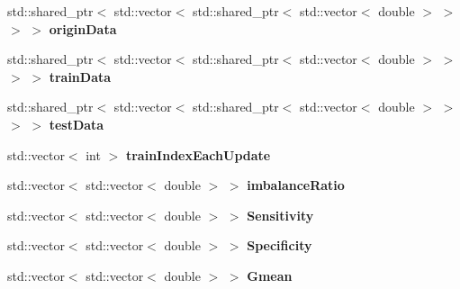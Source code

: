 \begin{DoxyCompactItemize}
\item 
std\+::shared\+\_\+ptr$<$ std\+::vector$<$ std\+::shared\+\_\+ptr$<$ std\+::vector$<$ double $>$ $>$ $>$ $>$ {\bfseries origin\+Data}\hypertarget{class_abstract_test_example_a8f79d0ca14dcd405089698c9223ede30}{}\label{class_abstract_test_example_a8f79d0ca14dcd405089698c9223ede30}

\item 
std\+::shared\+\_\+ptr$<$ std\+::vector$<$ std\+::shared\+\_\+ptr$<$ std\+::vector$<$ double $>$ $>$ $>$ $>$ {\bfseries train\+Data}\hypertarget{class_abstract_test_example_ae2565b00a6090a55b5bce07246a33f56}{}\label{class_abstract_test_example_ae2565b00a6090a55b5bce07246a33f56}

\item 
std\+::shared\+\_\+ptr$<$ std\+::vector$<$ std\+::shared\+\_\+ptr$<$ std\+::vector$<$ double $>$ $>$ $>$ $>$ {\bfseries test\+Data}\hypertarget{class_abstract_test_example_aa44ef857d822f6c13174ebf4023ca765}{}\label{class_abstract_test_example_aa44ef857d822f6c13174ebf4023ca765}

\item 
std\+::vector$<$ int $>$ {\bfseries train\+Index\+Each\+Update}\hypertarget{class_abstract_test_example_a465e6238606eb8b653f6020e058168f9}{}\label{class_abstract_test_example_a465e6238606eb8b653f6020e058168f9}

\item 
std\+::vector$<$ std\+::vector$<$ double $>$ $>$ {\bfseries imbalance\+Ratio}\hypertarget{class_abstract_test_example_a9ffe694d18708706fbc7a1d685e5d826}{}\label{class_abstract_test_example_a9ffe694d18708706fbc7a1d685e5d826}

\item 
std\+::vector$<$ std\+::vector$<$ double $>$ $>$ {\bfseries Sensitivity}\hypertarget{class_abstract_test_example_a3c5c23ec871258e03796cb61224df404}{}\label{class_abstract_test_example_a3c5c23ec871258e03796cb61224df404}

\item 
std\+::vector$<$ std\+::vector$<$ double $>$ $>$ {\bfseries Specificity}\hypertarget{class_abstract_test_example_a190c85d08627285bbe1841f9655b7d4a}{}\label{class_abstract_test_example_a190c85d08627285bbe1841f9655b7d4a}

\item 
std\+::vector$<$ std\+::vector$<$ double $>$ $>$ {\bfseries Gmean}\hypertarget{class_abstract_test_example_aadddb4c176594175f10d0db9b6a9ec85}{}\label{class_abstract_test_example_aadddb4c176594175f10d0db9b6a9ec85}


\end{DoxyCompactItemize}
